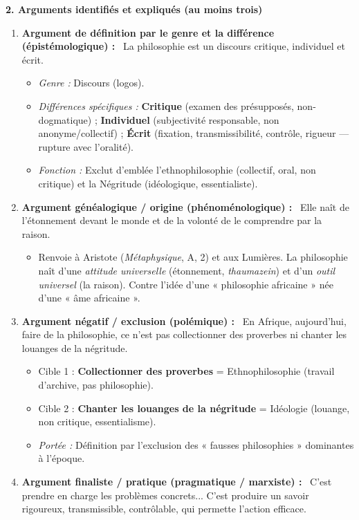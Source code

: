 \documentclass[11pt]{article}
\begin{document}
\begin{corrige}
\textbf{2. Arguments identifiés et expliqués (au moins trois)}
\begin{enumerate}
\item \textbf{Argument de définition par le genre et la différence (épistémologique) :} \guillemotleft~La philosophie est un discours critique, individuel et écrit.~\guillemotright
\begin{itemize}
\item \emph{Genre :} Discours (logos).
\item \emph{Différences spécifiques :} \textbf{Critique} (examen des présupposés, non-dogmatique) ; \textbf{Individuel} (subjectivité responsable, non anonyme/collectif) ; \textbf{Écrit} (fixation, transmissibilité, contrôle, rigueur — rupture avec l'oralité).
\item \emph{Fonction :} Exclut d'emblée l'ethnophilosophie (collectif, oral, non critique) et la Négritude (idéologique, essentialiste).
\end{itemize}
\item \textbf{Argument généalogique / origine (phénoménologique) :} \guillemotleft~Elle naît de l'étonnement devant le monde et de la volonté de le comprendre par la raison.~\guillemotright
\begin{itemize}
\item Renvoie à Aristote (\emph{Métaphysique}, A, 2) et aux Lumières. La philosophie naît d'une \emph{attitude universelle} (étonnement, \emph{thaumazein}) et d'un \emph{outil universel} (la raison). Contre l'idée d'une « philosophie africaine » née d'une « âme africaine ».
\end{itemize}
\item \textbf{Argument négatif / exclusion (polémique) :} \guillemotleft~En Afrique, aujourd'hui, faire de la philosophie, ce n'est pas collectionner des proverbes ni chanter les louanges de la négritude.~\guillemotright
\begin{itemize}
\item Cible 1 : \textbf{Collectionner des proverbes} = Ethnophilosophie (travail d'archive, pas philosophie).
\item Cible 2 : \textbf{Chanter les louanges de la négritude} = Idéologie (louange, non critique, essentialisme).
\item \emph{Portée :} Définition par l'exclusion des « fausses philosophies » dominantes à l'époque.
\end{itemize}
\item \textbf{Argument finaliste / pratique (pragmatique / marxiste) :} \guillemotleft~C'est prendre en charge les problèmes concrets... C'est produire un savoir rigoureux, transmissible, contrôlable, qui permette l'action efficace.~\guillemotright

\end{enumerate}
\end{corrige}
\end{document}
